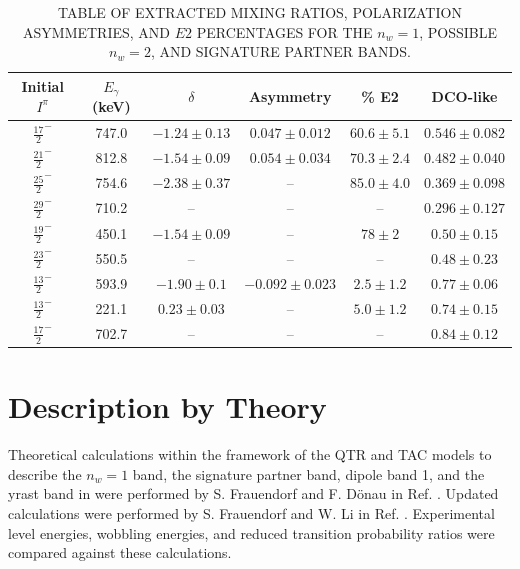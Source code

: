 \begin{table}
\begin{center}
\caption{TABLE OF EXTRACTED MIXING RATIOS, POLARIZATION ASYMMETRIES, AND $E2$ PERCENTAGES FOR THE $n_w=1$, POSSIBLE $n_w=2$, AND SIGNATURE PARTNER BANDS.\label{tbl:chp4-mixing-asym}}
\begin{tabular}{|c|c|c|c|c|c|}
\hline
\hline
Initial $I^\pi{}$ &$E_{\gamma}$ (keV) &$\delta$ & Asymmetry & \% E2 & DCO-like\\
\hline
$\frac{17}{2}^-$ & 747.0 & $-1.24\pm0.13$ & $0.047\pm0.012$ & $60.6\pm5.1$ & $0.546\pm0.082$\\
$\frac{21}{2}^-$ & 812.8 & $-1.54\pm0.09$ & $0.054\pm0.034$ & $70.3\pm2.4$ & $0.482\pm0.040$\\
$\frac{25}{2}^-$ & 754.6 & $-2.38\pm0.37$ & -- & $85.0\pm4.0$ & $0.369\pm0.098$\\
$\frac{29}{2}^-$ & 710.2 & -- & -- & -- & $0.296\pm0.127$\\
\hline
$\frac{19}{2}^-$ & 450.1 & $-1.54\pm0.09$ & -- & $78\pm2$ & $0.50\pm0.15$\\
$\frac{23}{2}^-$ & 550.5 & -- & -- & -- & $0.48\pm0.23$\\
\hline
$\frac{13}{2}^-$ & 593.9 & $-1.90\pm0.1$ & $-0.092\pm{}0.023$ & $2.5\pm1.2$ & $0.77\pm0.06$\\
$\frac{13}{2}^-$ & 221.1 & $0.23\pm0.03$ & -- & $5.0\pm1.2$ & $0.74\pm0.15$\\
$\frac{17}{2}^-$ & 702.7 & -- & -- & -- & $0.84\pm0.12$\\
\hline
\hline\end{tabular}
\end{center}
\end{table}

\section{Description by Theory}
\label{sec:trw-theory-desc}
Theoretical calculations within the framework of the QTR and TAC models to describe the $n_w=1$ band, the signature partner band, dipole band 1, and the yrast band in \pr{} were performed by S. Frauendorf and F. D\"onau in Ref. \cite{frauendorfTransverseWobbling}. Updated calculations were performed by S. Frauendorf and W. Li in Ref. \cite{mattaTransversePRL}. Experimental level energies, wobbling energies, and reduced transition probability ratios were compared against these calculations.

